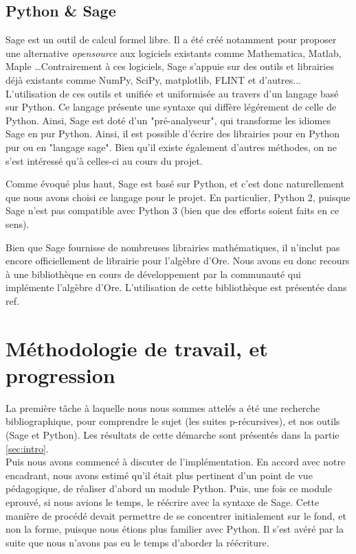 \documentclass[12pt]{article}
\begin{document}
    \subsection{Python \& Sage}
        \label{ssec:sage}
        \par Sage est un outil de calcul formel libre.
        Il a été créé notamment pour proposer
        une alternative \textit{opensource} aux logiciels existants comme Mathematica,
        Matlab, Maple \ldots Contrairement à ces logiciels, Sage s'appuie sur des outils
        et librairies déjà existants comme NumPy, SciPy, matplotlib, FLINT et d'autres...
        L'utilisation de ces outils et unifiée et uniformisée au travers d'un langage
        basé sur Python. Ce langage présente une syntaxe qui diffère légérement de celle
        de Python. Ainsi, Sage est doté d'un "pré-analyseur",
        qui transforme les idiomes Sage en pur Python.
        Ainsi, il est possible d'écrire des librairies pour en Python pur ou en "langage sage".
        Bien qu'il existe également d'autres méthodes, on ne s'est intéressé qu'à celles-ci au
        cours du projet.
        \par Comme évoqué plus haut, Sage est basé sur Python, et c'est donc naturellement
        que nous avons choisi ce langage pour le projet.
        En particulier, Python 2, puisque Sage n'est pas compatible avec Python 3
        (bien que des efforts soient faits en ce sens).
        \par Bien que Sage fournisse de nombreuses librairies mathématiques,
        il n'inclut pas encore officiellement de librairie pour l'algèbre d'Ore.
        Nous avons eu donc recours à une bibliothèque en cours de développement par
        la communauté qui implémente l'algèbre d'Ore. L'utilisation de cette bibliothèque
        est présentée dans {\color{red} ref}.
\section{Méthodologie de travail, et progression}
    \label{sec:methodo}
    \par La première tâche à laquelle nous nous sommes attelés a été une recherche bibliographique,
    pour comprendre le sujet (les suites p-récursives), et nos outils (Sage et Python).
    Les résultats de cette démarche sont présentés dans la partie \ref{sec:intro}.\\
    Puis nous avons commencé à discuter de l'implémentation. En accord avec notre encadrant,
    nous avons estimé qu'il était plus pertinent d'un point de vue pédagogique, de réaliser
    d'abord un module Python. Puis, une fois ce module eprouvé, si nous avions le temps,
    le réécrire avec la syntaxe de Sage. Cette manière de procédé devait permettre de se
    concentrer initialement sur le fond, et non la forme, puisque nous étions plus familier
    avec Python. {\color{blue} Il s'est avéré par la suite que nous n'avons pas eu le temps
    d'aborder la réécriture}.
\end{document}
